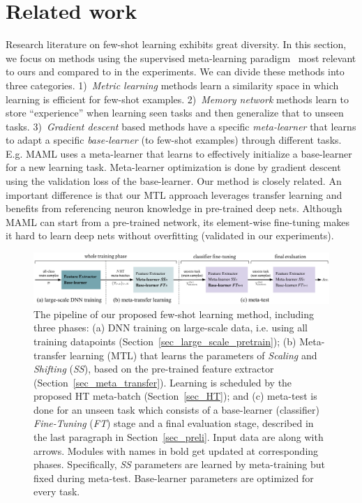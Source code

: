 \section{Related work}
%
%
Research literature on few-shot learning exhibits great diversity. 
%
In this section, we focus on methods using the supervised meta-learning paradigm~\cite{Hinton1987, Thrun1998, FinnAL17} most relevant to ours
%
and compared to in the experiments. 
%
We can divide these methods into three categories.
1)~\emph{Metric learning} methods \cite{VinyalsBLKW16, SnellSZ17, SungCVPR2018} learn a similarity space in which learning is efficient for few-shot examples.
%
2)~\emph{Memory network} methods \cite{MunkhdalaiICML2017, SantoroBBWL16, OreshkinNIPS18, MishraICLR2018} learn to store ``experience'' when learning seen tasks and then generalize that to unseen tasks.
%
3)~\emph{Gradient descent} based methods \cite{FinnAL17, RaviICLR2017, LeeICML18, GrantICLR2018, ZhangNIPS2018MetaGAN} have a specific \emph{meta-learner} that learns to adapt a specific \emph{base-learner} (to few-shot examples) through different tasks. E.g. MAML \cite{FinnAL17} uses a meta-learner that learns to effectively initialize a base-learner for a new learning task.
%
Meta-learner optimization is done by gradient descent using the validation loss of the base-learner.
%
Our method is closely related.
%
An important difference is that our MTL approach leverages transfer learning and benefits from referencing neuron knowledge in pre-trained deep nets. Although MAML can start from a pre-trained network, its element-wise fine-tuning makes it hard to learn deep nets without overfitting (validated in our experiments).
%

\begin{figure}[htp]
  \centering
  \includegraphics[width=0.99\linewidth]{figures/main_framework_meta_transf_hard_task.pdf}
     \caption{The pipeline of our proposed few-shot learning method, including three phases: (a) DNN training on large-scale data, i.e. using all training datapoints (Section~\ref{sec_large_scale_pretrain}); (b) Meta-transfer learning (MTL) that learns the parameters of \emph{Scaling} and \emph{Shifting} (\emph{SS}), based on the pre-trained feature extractor (Section~\ref{sec_meta_transfer}). Learning is scheduled by the proposed HT meta-batch (Section~\ref{sec_HT}); and (c) meta-test is done for an unseen task which consists of a base-learner (classifier) \emph{Fine-Tuning} (\emph{FT}) stage and a final evaluation stage, described in the last paragraph in Section~\ref{sec_preli}. 
     Input data are along with arrows. Modules with names in bold get updated at corresponding phases. Specifically, \emph{SS} parameters are learned by meta-training but fixed during meta-test. Base-learner parameters are optimized for every task.}
     \vspace{-0.3cm}
  \label{main_framework_meta_transf_hard_task}
\end{figure}


